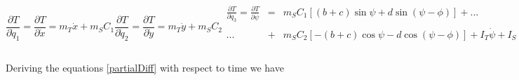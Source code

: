 \documentclass[sublist]{fei}
\begin{document}
\begin{subequations} \label{partialDiff}
\begin{equation}
    \frac{\partial T}{\partial \dot{q}_1} = \frac{\partial T}{\partial \dot{x}} = m_{T} \dot{x} + m_S C_1
\end{equation}
\begin{equation}
    \frac{\partial T}{\partial \dot{q}_2} = \frac{\partial T}{\partial \dot{y}} = m_{T} \dot{y} + m_S C_2
\end{equation}
\begin{eqnarray}
    \nonumber
    \frac{\partial T}{\partial q_3} = \frac{\partial T}{\partial \dot{\psi}} &=& m_S C_1 \left[ \left( b + c \right) \sin \psi + d \sin \left( \psi - \phi \right) \right] + ... \\
    \nonumber
    ... &+& m_S C_2 \left[ - \left( b + c \right) \cos \psi - d \cos \left( \psi - \phi \right) \right] + I_T \dot{\psi} + I_S \left( \dot{\psi} - \dot{\phi} \right) \\
\end{eqnarray}
\begin{equation}
    \frac{\partial T}{\partial q_4} = \frac{\partial T}{\partial \dot{\phi}} = m_S C_1 \left[ - d \sin \left( \psi - \phi \right) \right] + m_S C_2 \left[ d \cos \left( \psi - \phi \right) \right] - I_S \left( \dot{\psi} - \dot{\phi} \right).
\end{equation}
\end{subequations}

Deriving the equations \eqref{partialDiff} with respect to time we have
\end{document}
